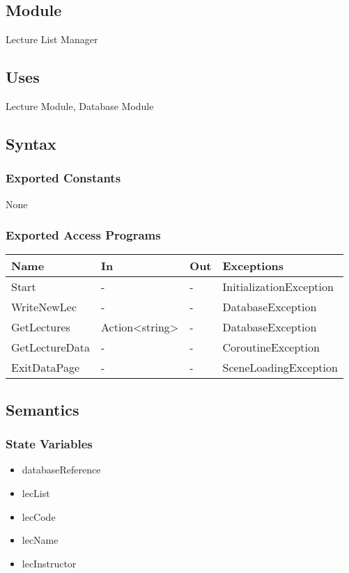 \documentclass[12pt, titlepage]{article}
\begin{document}
\subsection{Module}

Lecture List Manager

\subsection{Uses}

Lecture Module, Database Module

\subsection{Syntax}

\subsubsection{Exported Constants}
None

\subsubsection{Exported Access Programs}
\begin{center}
\begin{tabular}{p{4cm} p{2cm} p{4cm} p{4cm}}
\hline
\textbf{Name} & \textbf{In} & \textbf{Out} & \textbf{Exceptions} \\
\hline
Start & - & - & InitializationException \\
WriteNewLec & - & - & DatabaseException \\
GetLectures & Action<string> & - & DatabaseException \\
GetLectureData & - & - & CoroutineException \\
ExitDataPage & - & - & SceneLoadingException \\
\hline
\end{tabular}
\end{center}

\subsection{Semantics}

\subsubsection{State Variables}

\begin{itemize}
\item databaseReference
\item lecList
\item lecCode
\item lecName
\item lecInstructor
\end{itemize}
\end{document}
